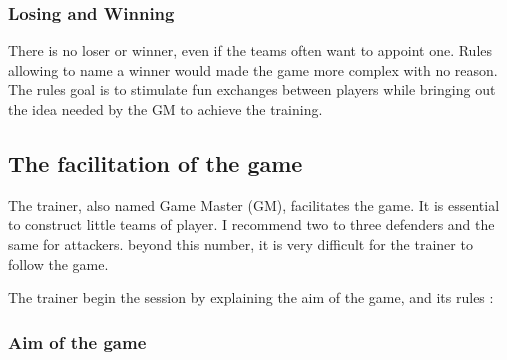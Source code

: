 \documentclass[11pt]{article} %
\begin{document}
\subsubsection{Losing and Winning}

There is no loser or winner, even if the teams often want to appoint one. 
Rules allowing to name a winner would made the game more complex with no reason. 
The rules goal is to stimulate fun exchanges between players while bringing out the idea
needed by the GM to achieve the training.

%
%

\subsection{The facilitation of the game}
The trainer, also named Game Master (GM), facilitates the game.
It is essential to construct little teams of player. I recommend two to 
three defenders and the same for attackers. beyond this number, it is very 
difficult for the trainer to follow the game. 

The trainer begin the session by explaining the aim of the game, and its rules : \\

\subsubsection{Aim of the game}
\end{document}
